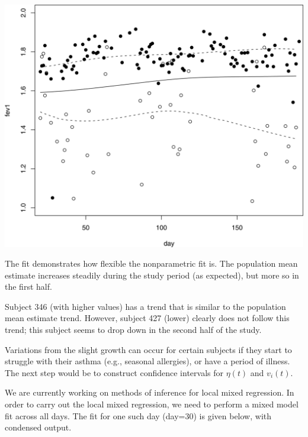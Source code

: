 \documentclass[
  9pt,
  ignorenonframetext,
]{beamer}
\begin{document}
\begin{frame}{}
\protect\hypertarget{section-8}{}
\begin{center}\includegraphics[width=0.7\linewidth]{figs_L21/f2} \end{center}
\end{frame}

\begin{frame}{}
\protect\hypertarget{section-9}{}
The fit demonstrates how flexible the nonparametric fit is. The
population mean estimate increases steadily during the study period (as
expected), but more so in the first half.

Subject 346 (with higher values) has a trend that is similar to the
population mean estimate trend. However, subject 427 (lower) clearly
does not follow this trend; this subject seems to drop down in the
second half of the study.

Variations from the slight growth can occur for certain subjects if they
start to struggle with their asthma (e.g., seasonal allergies), or have
a period of illness. The next step would be to construct confidence
intervals for \(\eta (t)\) and \(v_i(t)\).

We are currently working on methods of inference for local mixed
regression. In order to carry out the local mixed regression, we need to
perform a mixed model fit across all days. The fit for one such day
(day=30) is given below, with condensed output.
\end{frame}
\end{document}
